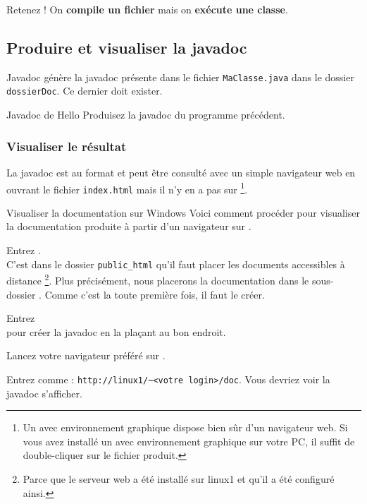 \documentclass[a4paper,11pt]{style-esi/td}
\begin{document}
		\begin{alerttbox}{Retenez !} 
			On \textbf{compile un fichier} mais on \textbf{exécute une classe}.
		\end{alerttbox}

	\subsection{Produire et visualiser la javadoc}

		\begin{theorie}{Javadoc}
			génère la javadoc présente dans le fichier \texttt{MaClasse.java}
			dans le dossier \texttt{dossierDoc}. Ce dernier doit exister.
		\end{theorie}

		\begin{Exercice}{Javadoc de Hello}
			Produisez la javadoc du programme  précédent.
		\end{Exercice}

		\subsubsection*{Visualiser le résultat}

		La javadoc est au format  et peut être consulté
		avec un simple navigateur web en ouvrant le fichier \verb|index.html|
		mais il n'y en a pas sur %
		\footnote{%
			Un  avec environnement graphique 
			dispose bien sûr d'un navigateur web.
			Si vous avez installé un  avec environnement graphique
			sur votre PC, il suffit de double-cliquer sur le fichier
			 produit.
		}.

		\begin{Tutoriel}{Visualiser la documentation sur Windows}
			Voici comment procéder pour visualiser la documentation
			produite à partir d'un navigateur sur .
			\begin{steps}
			\item 
				Entrez .
				\\
				C'est dans le dossier \verb|public_html|
				qu'il faut placer les documents accessibles à distance%
				\footnote{%
					Parce que le serveur web  a été installé
					sur linux1 et qu'il a été configuré ainsi.
				}.
				Plus précisément, nous placerons la documentation
				dans le sous-dossier .
				Comme c'est la toute première fois, il faut le créer.
			\item 
				Entrez 
				\\pour créer la javadoc en la plaçant au bon endroit.
			\item 
				Lancez votre navigateur préféré sur .
			\item 
				Entrez comme  : \verb|http://linux1/~<votre login>/doc|.
				Vous devriez voir la javadoc s'afficher.
			\end{steps}
		\end{Tutoriel}
\end{document}
